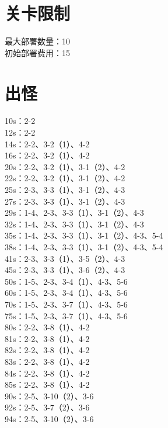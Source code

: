 \documentclass[a4paper,12pt]{article}
\begin{document}
	\section{关卡限制}
		最大部署数量：10\\
		\indent 初始部署费用：15
	\section{出怪}
		10s：2-2\\
		\indent 12s：2-2\\
		\indent 14s：2-2、3-2（1）、4-2\\
		\indent 16s：2-2、3-2（1）、4-2\\
		\indent 20s：2-2、3-2（1）、3-1（2）、4-2\\
		\indent 22s：2-2、3-2（1）、3-1（2）、4-2\\
		\indent 25s：2-3、3-3（1）、3-1（2）、4-3\\
		\indent 27s：2-3、3-3（1）、3-1（2）、4-3\\
		\indent 29s：1-4、2-3、3-3（1）、3-1（2）、4-3\\
		\indent 32s：1-4、2-3、3-3（1）、3-1（2）、4-3\\
		\indent 35s：1-4、2-3、3-3（1）、3-1（2）、4-3、5-4\\
		\indent 38s：1-4、2-3、3-3（1）、3-1（2）、4-3、5-4\\
		\indent 41s：2-3、3-3（1）、3-5（2）、4-3\\
		\indent 45s：2-3、3-3（1）、3-6（2）、4-3\\
		\indent 50s：1-5、2-3、3-4（1）、4-3、5-6\\
		\indent 60s：1-5、2-3、3-4（1）、4-3、5-6\\
		\indent 70s：1-5、2-3、3-7（1）、4-3、5-6\\
		\indent 75s：1-5、2-3、3-7（1）、4-3、5-6\\
		\indent 80s：2-2、3-8（1）、4-2\\
		\indent 81s：2-2、3-8（1）、4-2\\
		\indent 82s：2-2、3-8（1）、4-2\\
		\indent 83s：2-2、3-8（1）、4-2\\
		\indent 84s：2-2、3-8（1）、4-2\\
		\indent 85s：2-2、3-8（1）、4-2\\
		\indent 90s：2-5、3-10（2）、3-6\\
		\indent 92s：2-5、3-7（2）、3-6\\
		\indent 94s：2-5、3-10（2）、3-6\\
\end{document}
